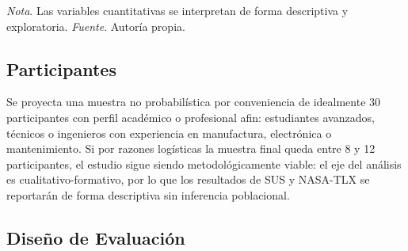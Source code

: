\begin{table}[H]
\centering
\caption{Variables de investigaci\'on, instrumentos y criterios de interpretaci\'on}
\small
{}
\par\vspace{0.5\baselineskip}
\textit{Nota}. Las variables cuantitativas se interpretan de forma descriptiva y exploratoria. \textit{Fuente}. Autor\'ia propia.
\end{table}

\subsection{Participantes}

Se proyecta una muestra no probabil\'istica por conveniencia de idealmente 30 participantes con perfil acad\'emico o profesional afin: estudiantes avanzados, t\'ecnicos o ingenieros con experiencia en manufactura, electr\'onica o mantenimiento. Si por razones log\'isticas la muestra final queda entre 8 y 12 participantes, el estudio sigue siendo metodol\'ogicamente viable: el eje del an\'alisis es cualitativo-formativo, por lo que los resultados de SUS y NASA-TLX se reportar\'an de forma descriptiva sin inferencia poblacional.

\subsection{Dise\~no de Evaluaci\'on}

